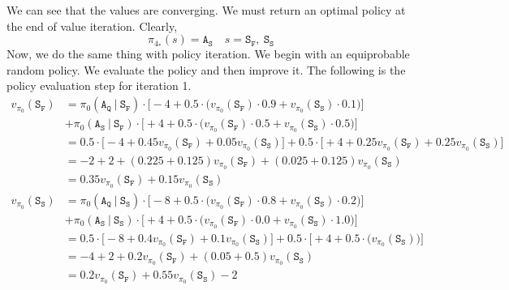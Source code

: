 \documentclass[11pt]{article}
\begin{document}
    We can see that the values are converging. We must return an optimal policy at the end of value iteration. Clearly,
    $$\pi_{4_{*}}(s) = \texttt{A}_{\texttt{S}} \quad s = \texttt{S}_{\texttt{F}}, \ \texttt{S}_{\texttt{S}}$$
    Now, we do the same thing with policy iteration. We begin with an equiprobable random policy. We evaluate the policy
    and then improve it. The following is the policy evaluation step for iteration 1.
    \begin{align*}
        v_{\pi_{0}}(\texttt{S}_{\texttt{F}}) &= \pi_{0}(\texttt{A}_{\texttt{Q}} \ | \ \texttt{S}_{\texttt{F}}) \cdot \big[ -4 + 0.5 \cdot \big( v_{\pi_{0}}(\texttt{S}_{\texttt{F}}) \cdot 0.9 + v_{\pi_{0}}(\texttt{S}_{\texttt{S}}) \cdot 0.1 \big) \big] \\
        &+ \pi_{0}(\texttt{A}_{\texttt{S}} \ | \ \texttt{S}_{\texttt{F}}) \cdot \big[ +4 + 0.5 \cdot \big( v_{\pi_{0}}(\texttt{S}_{\texttt{F}}) \cdot 0.5 + v_{\pi_{0}}(\texttt{S}_{\texttt{S}}) \cdot 0.5 \big) \big] \\
        &= 0.5 \cdot \big[ -4 + 0.45 v_{\pi_{0}}(\texttt{S}_{\texttt{F}}) + 0.05 v_{\pi_{0}}(\texttt{S}_{\texttt{S}}) \big] + 0.5 \cdot \big[ +4 + 0.25 v_{\pi_{0}}(\texttt{S}_{\texttt{F}}) + 0.25 v_{\pi_{0}}(\texttt{S}_{\texttt{S}}) \big] \\
        &= -2 + 2 + (0.225 + 0.125) v_{\pi_{0}}(\texttt{S}_{\texttt{F}}) + (0.025 + 0.125) v_{\pi_{0}}(\texttt{S}_{\texttt{S}}) \\
        &= 0.35 v_{\pi_{0}}(\texttt{S}_{\texttt{F}}) + 0.15 v_{\pi_{0}}(\texttt{S}_{\texttt{S}}) \\
        v_{\pi_{0}}(\texttt{S}_{\texttt{S}}) &= \pi_{0}(\texttt{A}_{\texttt{Q}} \ | \ \texttt{S}_{\texttt{S}}) \cdot \big[ -8 + 0.5 \cdot \big( v_{\pi_{0}}(\texttt{S}_{\texttt{F}}) \cdot 0.8 + v_{\pi_{0}}(\texttt{S}_{\texttt{S}}) \cdot 0.2 \big) \big] \\
        &+ \pi_{0}(\texttt{A}_{\texttt{S}} \ | \ \texttt{S}_{\texttt{S}}) \cdot \big[ +4 + 0.5 \cdot \big( v_{\pi_{0}}(\texttt{S}_{\texttt{F}}) \cdot 0.0 + v_{\pi_{0}}(\texttt{S}_{\texttt{S}}) \cdot 1.0 \big) \big] \\
        &= 0.5 \cdot \big[ -8 + 0.4 v_{\pi_{0}}(\texttt{S}_{\texttt{F}}) + 0.1 v_{\pi_{0}}(\texttt{S}_{\texttt{S}}) \big] + 0.5 \cdot \big[ +4 + 0.5 \cdot \big( v_{\pi_{0}}(\texttt{S}_{\texttt{S}}) \big) \big] \\
        &= -4 + 2 + 0.2 v_{\pi_{0}}(\texttt{S}_{\texttt{F}}) + (0.05 + 0.5) v_{\pi_{0}}(\texttt{S}_{\texttt{S}}) \\
        &= 0.2 v_{\pi_{0}}(\texttt{S}_{\texttt{F}}) + 0.55 v_{\pi_{0}}(\texttt{S}_{\texttt{S}}) - 2
    \end{align*}
\end{document}
